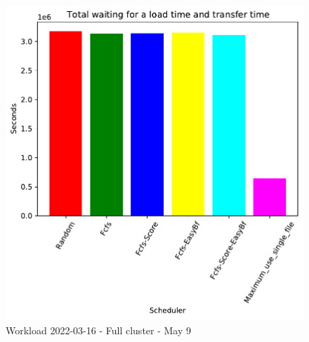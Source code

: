 \begin{figure}[H]
	\begin{minipage}[b]{0.5\linewidth}\centering\includegraphics[width=1\linewidth]{MBSS/plot/2022-03-16_Total_waiting_for_a_load_time_and_transfer_time450_128_32_256_4_1024.pdf}\caption{Waiting for a load + Transfer time}\vspace{4ex}\end{minipage}\caption{Workload 2022-03-16 - Full cluster - May 9}\end{figure}




